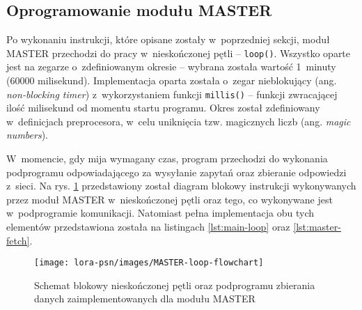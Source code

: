 



\FloatBarrier
\subsection{Oprogramowanie modułu MASTER\label{sect:firmware-master}} Po wykonaniu instrukcji, które
opisane zostały w~poprzedniej sekcji, moduł MASTER przechodzi do pracy w~nieskończonej pętli -- \texttt{loop()}.
Wszystko oparte jest na zegarze o~zdefiniowanym okresie -- wybrana została wartość 1~minuty (60000 milisekund).
Implementacja oparta została o~zegar nieblokujący (ang. \textsl{non-blocking timer}) z~wykorzystaniem funkcji
\texttt{millis()} -- funkcji zwracającej ilość milisekund od momentu startu programu. Okres został zdefiniowany
w~definicjach preprocesora, w~celu uniknięcia tzw. magicznych liczb (ang. \textsl{magic numbers}).

W~momencie, gdy mija wymagany czas, program przechodzi do wykonania podprogramu odpowiadającego za wysyłanie zapytań
oraz zbieranie odpowiedzi z~sieci. Na rys. \ref{img:master-flowchart} przedstawiony został diagram blokowy instrukcji
wykonywanych przez moduł MASTER w~nieskończonej pętli oraz tego, co wykonywane jest w~podprogramie komunikacji.
Natomiast pełna implementacja obu tych elementów przedstawiona została na listingach \ref{lst:main-loop} oraz
\ref{lst:master-fetch}.

\begin{figure}[!htbp]
    \centering
    \texttt{[image: lora-psn/images/MASTER-loop-flowchart]}
    \caption{\label{img:master-flowchart}Schemat blokowy nieskończonej pętli oraz podprogramu zbierania danych
        zaimplementowanych dla modułu MASTER}
\end{figure}




